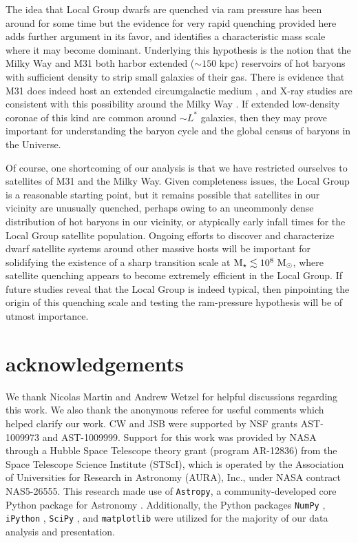\documentclass[usenatbib]{mn2e}
\newcommand{\mstar}{{\rm M}_{\star}}
\newcommand{\msun}{{\rm M}_{\odot}}
\begin{document}
The idea that Local Group dwarfs are quenched via ram pressure has
been around for some time \citep[e.g.][]{einasto74, lin83, blitz00}
but the evidence for very rapid quenching provided here adds further
argument in its favor, and identifies a characteristic mass scale
where it may become dominant. Underlying this hypothesis is the notion
that the Milky Way and M31 both harbor extended ($\sim 150$ kpc)
reservoirs of hot baryons with sufficient density to strip small
galaxies of their gas. There is evidence that M31 does indeed host an
extended circumgalactic medium \citep{lehner15}, and X-ray studies are
consistent with this possibility around the Milky Way
\citep{fang13,miller15,fang15}. If extended low-density coronae of
this kind are common around $\sim L^{*}$ galaxies, then they may prove
important for understanding the baryon cycle and the global census of
baryons in the Universe.


Of course, one shortcoming of our analysis is that we have restricted
ourselves to satellites of M31 and the Milky Way. Given completeness
issues, the Local Group is a reasonable starting point, but it remains
possible that satellites in our vicinity are unusually quenched,
perhaps owing to an uncommonly dense distribution of hot baryons in
our vicinity, or atypically early infall times for the Local Group
satellite population. Ongoing efforts to discover and characterize
dwarf satellite systems around other massive hosts will be important
for solidifying the existence of a sharp transition scale at $\mstar
\lesssim 10^{8}~\msun$, where satellite quenching appears to become
extremely efficient in the Local Group. If future studies reveal that
the Local Group is indeed typical, then pinpointing the origin of this
quenching scale and testing the ram-pressure hypothesis will be of
utmost importance.



\section*{acknowledgements}

We thank Nicolas Martin and Andrew Wetzel for helpful discussions
regarding this work. We also thank the anonymous referee for useful
comments which helped clarify our work. CW and JSB were supported by
NSF grants AST-1009973 and AST-1009999. Support for this work was
provided by NASA through a Hubble Space Telescope theory grant
(program AR-12836) from the Space Telescope Science Institute (STScI),
which is operated by the Association of Universities for Research in
Astronomy (AURA), Inc., under NASA contract NAS5-26555. This research
made use of {\texttt{Astropy}}, a community-developed core Python
package for Astronomy \citep{astropy13}. Additionally, the Python
packages {\texttt{NumPy}} \citep{numpy}, {\texttt{iPython}}
\citep{ipython}, {\texttt{SciPy}} \citep{scipy}, and
{\texttt{matplotlib}} \citep{matplotlib} were utilized for the
majority of our data analysis and presentation.
\end{document}
